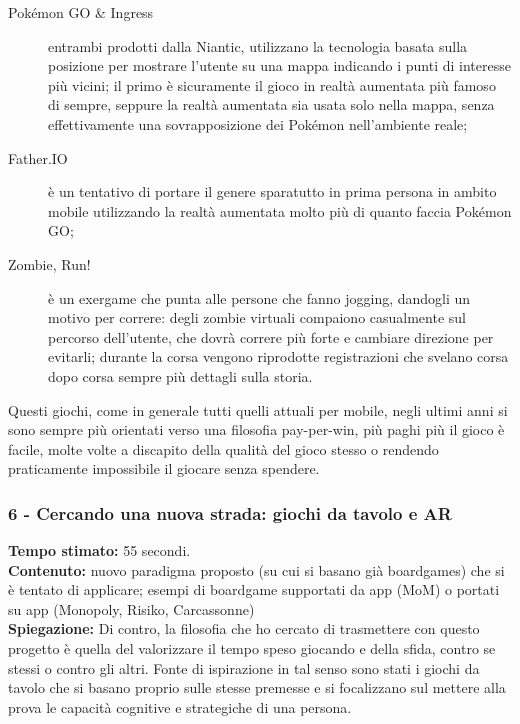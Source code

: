 \documentclass[
	twoside]				%
	{toptesi}				%
\begin{document}
	\begin{description}
		\item[Pokémon GO \& Ingress] entrambi prodotti dalla Niantic, utilizzano la tecnologia basata sulla posizione per mostrare l'utente su una mappa indicando i punti di interesse più vicini; il primo è sicuramente il gioco in realtà aumentata più famoso di sempre, seppure la realtà aumentata sia usata solo nella mappa, senza effettivamente una sovrapposizione dei Pokémon nell'ambiente reale;
		
		\item[Father.IO] è un tentativo di portare il genere sparatutto in prima persona in ambito mobile utilizzando la realtà aumentata molto più di quanto faccia Pokémon GO;
		
		\item[Zombie, Run!] è un exergame che punta alle persone che fanno jogging, dandogli un motivo per correre: degli zombie virtuali compaiono casualmente sul percorso dell'utente, che dovrà correre più forte e cambiare direzione per evitarli; durante la corsa vengono riprodotte registrazioni che svelano corsa dopo corsa sempre più dettagli sulla storia.
	\end{description}
	
	Questi giochi, come in generale tutti quelli attuali per mobile, negli ultimi anni si sono sempre più orientati verso una filosofia pay-per-win, più paghi più il gioco è facile, molte volte a discapito della qualità del gioco stesso o rendendo praticamente impossibile il giocare senza spendere.
	
	\subsubsection{6 - Cercando una nuova strada: giochi da tavolo e AR}
	
	\textbf{Tempo stimato:} 55 secondi. \\
	
	\textbf{Contenuto:} nuovo paradigma proposto (su cui si basano già boardgames) che si è tentato di applicare; esempi di boardgame supportati da app (MoM) o portati su app (Monopoly, Risiko, Carcassonne) \\
	
	\textbf{Spiegazione:} Di contro, la filosofia che ho cercato di trasmettere con questo progetto è quella del valorizzare il tempo speso giocando e della sfida, contro se stessi o contro gli altri.
	Fonte di ispirazione in tal senso sono stati i giochi da tavolo che si basano proprio sulle stesse premesse e si focalizzano sul mettere alla prova le capacità cognitive e strategiche di una persona.
	
\end{document}
